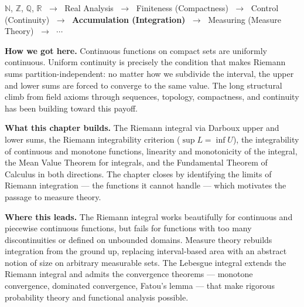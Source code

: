 
\begin{tcolorbox}[
  colback=gray!6,
  colframe=gray!40,
  arc=2pt,
  left=8pt, right=8pt, top=6pt, bottom=6pt,
  title={\small\textbf{Where You Are in the Journey}},
  fonttitle=\small\bfseries
]
\begin{center}
\small
$\mathbb{N}$, $\mathbb{Z}$, $\mathbb{Q}$, $\mathbb{R}$
$\;\to\;$ Real Analysis
$\;\to\;$ Finiteness (Compactness)
$\;\to\;$ Control (Continuity)
$\;\to\;$ \textbf{Accumulation (Integration)}
$\;\to\;$ Measuring (Measure Theory)
$\;\to\;$ $\cdots$
\end{center}

\medskip
\noindent\textbf{How we got here.}
Continuous functions on compact sets are uniformly continuous.
Uniform continuity is precisely the condition that makes Riemann
sums partition-independent: no matter how we subdivide the
interval, the upper and lower sums are forced to converge to the
same value.
The long structural climb from field axioms through sequences,
topology, compactness, and continuity has been building toward
this payoff.

\medskip
\noindent\textbf{What this chapter builds.}
The Riemann integral via Darboux upper and lower sums, the
Riemann integrability criterion ($\sup L = \inf U$), the
integrability of continuous and monotone functions, linearity
and monotonicity of the integral, the Mean Value Theorem for
integrals, and the Fundamental Theorem of Calculus in both
directions.
The chapter closes by identifying the limits of Riemann
integration --- the functions it cannot handle --- which
motivates the passage to measure theory.

\medskip
\noindent\textbf{Where this leads.}
The Riemann integral works beautifully for continuous and piecewise
continuous functions, but fails for functions with too many
discontinuities or defined on unbounded domains.
Measure theory rebuilds integration from the ground up, replacing
interval-based area with an abstract notion of size on arbitrary
measurable sets.
The Lebesgue integral extends the Riemann integral and admits
the convergence theorems --- monotone convergence, dominated
convergence, Fatou's lemma --- that make rigorous probability
theory and functional analysis possible.
\end{tcolorbox}
\vspace{1em}

